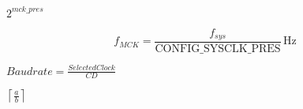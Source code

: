 \documentclass{article}
\begin{document}
$2^{mck\_pres}$
\pagebreak

\[ f_{MCK} = \frac{f_{sys}}{\mathrm{CONFIG\_SYSCLK\_PRES}}\,\mbox{Hz} \]
\pagebreak

$ Baudrate = \frac{SelectedClock}{CD} $
\pagebreak

$ \left\lceil \frac{a}{b} \right\rceil $
\pagebreak
\end{document}
